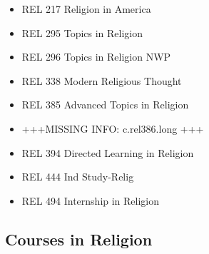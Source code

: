 \documentclass[
  letterpaper,
]{scrbook}
\providecommand{\tightlist}{%
  \setlength{\itemsep}{0pt}\setlength{\parskip}{0pt}}
\begin{document}
\begin{itemize}
  \begin{itemize}
  \tightlist
  \item
    REL 217 Religion in America
  \item
    REL 295 Topics in Religion
  \item
    REL 296 Topics in Religion NWP
  \item
    REL 338 Modern Religious Thought
  \item
    REL 385 Advanced Topics in Religion
  \item
    +++MISSING INFO: c.rel386.long +++
  \item
    REL 394 Directed Learning in Religion
  \item
    REL 444 Ind Study-Relig
  \item
    REL 494 Internship in Religion
  \end{itemize}
\end{itemize}

\subsection{Courses in Religion}\label{courses-in-religion}
\end{document}
